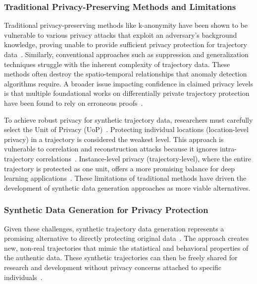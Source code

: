 \subsubsection{Traditional Privacy-Preserving Methods and Limitations}

Traditional privacy-preserving methods like k-anonymity have been shown to be vulnerable to various privacy attacks that exploit an adversary's background knowledge, proving unable to provide sufficient privacy protection for trajectory data~\cite{chenDifferentiallyPrivateTrajectory2011,buchholzReconstructionAttackDifferential2022,jinSurveyExperimentalStudy2023}. Similarly, conventional approaches such as suppression and generalization techniques struggle with the inherent complexity of trajectory data. These methods often destroy the spatio-temporal relationships that anomaly detection algorithms require. A broader issue impacting confidence in claimed privacy levels is that multiple foundational works on differentially private trajectory protection have been found to rely on erroneous proofs~\cite{buchholzSystematisationKnowledgeTrajectory2024,primaultDifferentiallyPrivateLocation2014,erroundaAnalysisDifferentialPrivacy2019}.

To achieve robust privacy for synthetic trajectory data, researchers must carefully select the Unit of Privacy (UoP)~\cite{buchholzSystematisationKnowledgeTrajectory2024,primaultLongRoadComputational2019}. Protecting individual locations (location-level privacy) in a trajectory is considered the weakest level. This approach is vulnerable to correlation and reconstruction attacks because it ignores intra-trajectory correlations~\cite{buchholzSystematisationKnowledgeTrajectory2024,buchholzReconstructionAttackDifferential2022,primaultDifferentiallyPrivateLocation2014,erroundaAnalysisDifferentialPrivacy2019}. Instance-level privacy (trajectory-level), where the entire trajectory is protected as one unit, offers a more promising balance for deep learning applications~\cite{buchholzSystematisationKnowledgeTrajectory2024}. These limitations of traditional methods have driven the development of synthetic data generation approaches as more viable alternatives.

\subsubsection{Synthetic Data Generation for Privacy Protection}

Given these challenges, synthetic trajectory data generation represents a promising alternative to directly protecting original data~\cite{buchholzSystematisationKnowledgeTrajectory2024,raoLSTMTrajGANDeepLearning2020,liuTrajGANsUsingGenerative2018}. The approach creates new, non-real trajectories that mimic the statistical and behavioral properties of the authentic data. These synthetic trajectories can then be freely shared for research and development without privacy concerns attached to specific individuals~\cite{raoLSTMTrajGANDeepLearning2020,liuTrajGANsUsingGenerative2018,quGenerativeAdversarialNetworks2020}.

